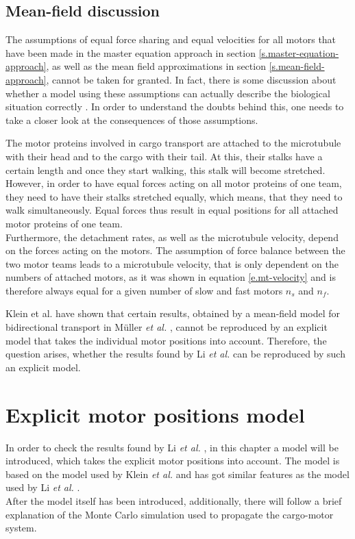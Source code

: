 \section{Mean-field discussion}\label{s.mean-field-discussion}
The assumptions of equal force sharing and equal velocities for all motors that have been made in the master equation approach in section \ref{s.master-equation-approach}, as well as the
mean field approximations in section \ref{s.mean-field-approach}, cannot be taken for granted. In fact, there is some discussion about whether a model using these assumptions can actually describe
the biological situation correctly \cite{sklein}. In order to understand the doubts behind this, one needs to take a closer look at the consequences of those assumptions.

The motor proteins involved in cargo transport are attached to the microtubule with their head and to the cargo with their tail. At this, their stalks have a certain length and once they start
walking, this stalk will become stretched. However, in order to have equal forces acting on all motor proteins of one team, they need to have their stalks stretched equally, which means, that they
need to walk simultaneously. Equal forces thus result in equal positions for all attached motor proteins of one team.\\
Furthermore, the detachment rates, as well as the microtubule velocity, depend on the forces acting on the motors. The assumption of force balance between the two motor teams leads to a microtubule
velocity, that is only dependent on the numbers of attached motors, as it was shown in equation \eqref{e.mt-velocity} and is therefore always equal for a given number of slow and fast motors $n_s$
and $n_f$.

Klein et al. \cite{sklein} have shown that certain results, obtained by a mean-field model for bidirectional transport in Müller \textit{et al.} \cite{pnas105}, cannot be reproduced by an explicit
model that takes the individual motor positions into account. Therefore, the question arises, whether the results found by Li \textit{et al.} \cite{li} can be reproduced by such an explicit model.





\chapter{Explicit motor positions model}\label{c.explicit-model}
In order to check the results found by Li \textit{et al.} \cite{li}, in this chapter a model will be introduced, which takes the explicit motor positions into account. The model is based on the
model used by Klein \textit{et al.} \cite{sklein} and has got similar features as the model used by Li \textit{et al.} \cite{li}.\\
After the model itself has been introduced, additionally, there will follow a brief explanation of the Monte Carlo simulation used to propagate the cargo-motor system.


